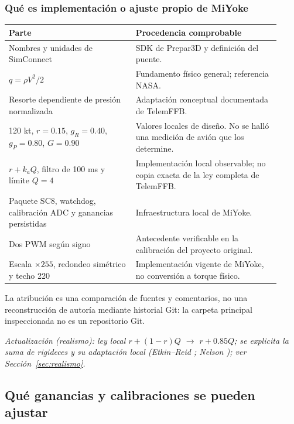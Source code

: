 \subsubsection{Qué es implementación o ajuste propio de MiYoke}
\begin{longtable}{p{0.43\linewidth}p{0.49\linewidth}}
\toprule Parte & Procedencia comprobable\\\midrule\endhead
Nombres y unidades de SimConnect & SDK de Prepar3D y definición del puente.\\
$q=\rho V^2/2$ & Fundamento físico general; referencia NASA.\\
Resorte dependiente de presión normalizada & Adaptación conceptual documentada de TelemFFB.\\
120 kt, $r=0.15$, $g_R=0.40$, $g_P=0.80$, $G=0.90$ & Valores locales de diseño. No se halló una medición de avión que los determine.\\
$r+k_aQ$, filtro de 100 ms y límite $Q=4$ & Implementación local observable; no copia exacta de la ley completa de TelemFFB.\\
Paquete SC8, watchdog, calibración ADC y ganancias persistidas & Infraestructura local de MiYoke.\\
Dos PWM según signo & Antecedente verificable en la calibración del proyecto original.\\
Escala $\times255$, redondeo simétrico y techo 220 & Implementación vigente de MiYoke, no conversión a torque físico.\\
\bottomrule
\end{longtable}
La atribución es una comparación de fuentes y comentarios, no una reconstrucción de autoría mediante historial Git: la carpeta principal inspeccionada no es un repositorio Git.

\textit{Actualización (realismo): ley local $r+(1-r)Q$ $\rightarrow$ $r+0.85Q$; se explicita la suma de rigideces y su adaptación local (Etkin--Reid \cite{etkin1996}; Nelson \cite{nelson1998}); ver Sección~\ref{sec:realismo}.}

\subsection{Qué ganancias y calibraciones se pueden ajustar}
